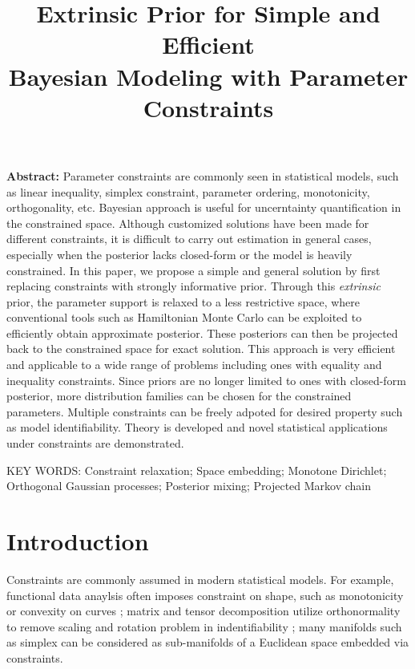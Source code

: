 \documentclass[10pt]{article}
\title{\textbf{Extrinsic Prior for Simple and Efficient\\ Bayesian Modeling with Parameter Constraints}}
\date{}
\DeclareMathOperator{\1}{\mathbbm{1}}
\begin{document}
\maketitle


{\bf Abstract:} Parameter constraints are commonly seen in statistical models, such as linear inequality, simplex constraint, parameter ordering, monotonicity, orthogonality, etc. Bayesian approach is useful for uncerntainty quantification in the constrained space. Although customized solutions have been made for different constraints, it is difficult to carry out estimation in general cases, especially when the posterior lacks closed-form or the model is heavily constrained. In this paper, we propose a simple and general solution by first replacing constraints with strongly informative prior. Through this {\it extrinsic} prior, the parameter support is relaxed to a less restrictive space, where conventional tools such as Hamiltonian Monte Carlo can be exploited to efficiently obtain approximate posterior.  These posteriors can then be projected back to the constrained space for exact solution. This approach is very efficient and applicable to a wide range of problems including ones with equality and inequality constraints. Since priors are no longer limited to ones with closed-form posterior, more distribution families can be chosen for the constrained parameters. Multiple constraints can be freely adpoted for desired property such as model identifiability. Theory is developed and novel statistical applications under constraints are demonstrated.
\vskip 12pt

{\noindent  KEY WORDS:  Constraint relaxation; Space embedding; Monotone Dirichlet; Orthogonal Gaussian processes; Posterior mixing; Projected Markov chain}
{}

\section{Introduction}

Constraints are commonly assumed in modern statistical models. For example, functional data anaylsis often imposes constraint on shape, such as monotonicity or convexity on curves \citep{kelly1990monotone}; matrix and tensor decomposition utilize orthonormality to remove scaling and rotation problem in indentifiability \citep{uschmajew2010well}; many manifolds such as simplex can be considered as sub-manifolds of a Euclidean space embedded via  constraints.
\end{document}
